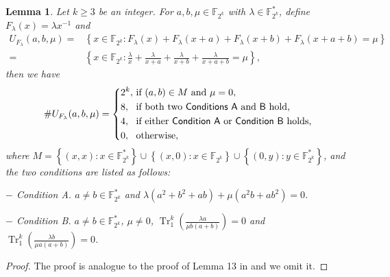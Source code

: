 \documentclass{article}
\newcommand{\F}{\mathbb{F}}
\newcommand{\0}{\textbf{0}}
\newcommand{\1}{\textbf{1}}
\newcommand{\TRACE}{\operatorname{Tr}_1^k}
\theoremstyle{plain}
\newtheorem{lemma}{Lemma}
\begin{document}
    \begin{lemma}\label{lemma:num_sol_second_dev}
        Let $k\ge 3$ be an integer.
        For $a,b,\mu\in\F_{2^k}$ with $\lambda\in\F_{2^k}^*$, define $F_{\lambda}(x)=\lambda x^{-1}$ and
        \begin{align*}
            U_{F_{\lambda}}(a,b,\mu)=&\left\{x\in\F_{2^k} : F_{\lambda}(x)+F_{\lambda}(x+a)+F_{\lambda}(x+b)+F_{\lambda}(x+a+b)=\mu\right\}\\
            =&\left\{ x\in\F_{2^k} : \frac{\lambda}{x}+\frac{\lambda}{x+a}+\frac{\lambda}{x+b}+\frac{\lambda}{x+a+b}=\mu \right\},
        \end{align*}
        then we have
        \[\# U_{F_{\lambda}}(a,b,\mu) = \left\{
            \begin{alignedat}{2}
                &2^k,&&\text{ if }(a,b)\in M\text{ and }\mu = 0,\\
                &8,&&\text{ if both two \textsf{Conditions~A}}\text{ and~\textsf{B}}\text{ hold,}\\
                &4,&&\text{ if either \textsf{Condition~A}}\text{ or~\textsf{Condition B}} \text{ holds,}\\
                &0,&&\text{ otherwise},
            \end{alignedat}\right.\]
        where $M=\left\{ (x,x):x\in\F_{2^k}^* \right\}\cup\left\{ (x,0):x\in\F_{2^k} \right\}\cup\left\{ (0,y):y\in\F_{2^k}^* \right\}$, and the two conditions are listed as follows:

        \noindent $-$  \textsf{Condition A}. $a\ne b\in\F_{2^k}^*$ and $\lambda(a^2+b^2+ab)+\mu(a^2b+ab^2)=0$.\label{item_a}
        
        \noindent $-$  \textsf{Condition B}. $a\ne b\in\F_{2^k}^*$, $\mu\ne 0$, $\TRACE\left(\frac{\lambda a}{\mu b(a+b)}\right)=0$ and $\TRACE\left(\frac{\lambda b}{\mu a(a+b)}\right)=0$.\label{item_b}
        
    \end{lemma}
    \begin{proof}
        The proof is analogue to the proof of Lemma 13 in \cite{TangMM2022inversefunction} and we omit it.
    \end{proof}
\end{document}
